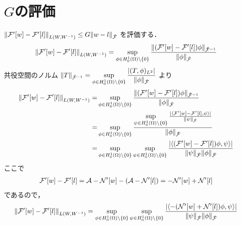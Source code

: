 \section{\(G\)の評価}
\(
    \norm{\mathcal{F}'\qty[w]-\mathcal{F}'\qty[l]}_{L\qty(W,W^{-1})}
    \leq
    G\norm{w-l}_{\tilde{\mathcal{F}}}
\)
を評価する．
\begin{align}
    \norm{\mathcal{F}'\qty[w]-\mathcal{F}'\qty[l]}_{L\qty(W,W^{-1})}
    =
    \sup\limits_{\phi \in H^1_0(\Omega) \backslash \{ 0 \} }
    \dfrac
    {\norm{\qty(\mathcal{F}'\qty[w]-\mathcal{F}'\qty[l])\phi}_{{\tilde{\mathcal{F}}}^{-1}}}
    {\norm{\phi}_{{\tilde{\mathcal{F}}}}} 
\end{align}
共役空間のノルム
\(
    \norm{T}_{{\tilde{\mathcal{F}}}^{-1}}=
    \sup\limits_{\phi \in H^1_0(\Omega) \backslash \{ 0 \} }
    \dfrac{|( T,\phi )_{L^2}|}{\norm{\phi}_{\tilde{\mathcal{F}}}}
\)
より
\begin{align}
    \norm{\mathcal{F}'\qty[w]-\mathcal{F}'\qty[l]}_{L\qty(W,W^{-1})}
    =&
    \sup\limits_{\phi \in H^1_0(\Omega) \backslash \{ 0 \} }
    \frac
    {\norm{\qty(\mathcal{F}'\qty[w]-\mathcal{F}'\qty[l])\phi}_{{\tilde{\mathcal{F}}}^{-1}}}
    {\norm{\phi}_{{\tilde{\mathcal{F}}}}}\\ 
    =&
    \sup\limits_{\phi \in H^1_0(\Omega) \backslash \{ 0 \} }
    \frac
    {\sup\limits_{\psi \in H^1_0(\Omega) \backslash \{ 0 \} }
    \frac
    {|\langle \mathcal{F}'\qty[w]-\mathcal{F}'\qty[l],\psi \rangle|}
    {\norm{\psi}_{\tilde{\mathcal{F}}}}}
    {\norm{\phi}_{{\tilde{\mathcal{F}}}}}\\
    =&
    \sup\limits_{\phi \in H^1_0(\Omega) \backslash \{ 0 \} }
    \sup\limits_{\psi \in H^1_0(\Omega) \backslash \{ 0 \} }
    \frac
    {|\langle \qty(\mathcal{F}'\qty[w]-\mathcal{F}'\qty[l])\phi,\psi \rangle|}
    {\norm{\psi}_{\tilde{\mathcal{F}}}\norm{\phi}_{\tilde{\mathcal{F}}}}
\end{align}
ここで
\begin{align}
    \mathcal{F}'\qty[w]-\mathcal{F}'\qty[l]
    =\mathcal{A} - \mathcal{N}'\qty[w]-\qty(\mathcal{A} - \mathcal{N}'\qty[l])
    =-\mathcal{N}'\qty[w]+\mathcal{N}'\qty[l]
\end{align}
であるので，
\begin{align}
    \norm{\mathcal{F}'\qty[w]-\mathcal{F}'\qty[l]}_{L\qty(W,W^{-1})}
    =
    \sup\limits_{\phi \in H^1_0(\Omega) \backslash \{ 0 \} }
    \sup\limits_{\psi \in H^1_0(\Omega) \backslash \{ 0 \} }
    \frac
    {|\langle -\qty(\mathcal{N}'\qty[w]+\mathcal{N}'\qty[l])\phi,\psi \rangle|}
    {\norm{\psi}_{\tilde{\mathcal{F}}}\norm{\phi}_{\tilde{\mathcal{F}}}}
\end{align}
